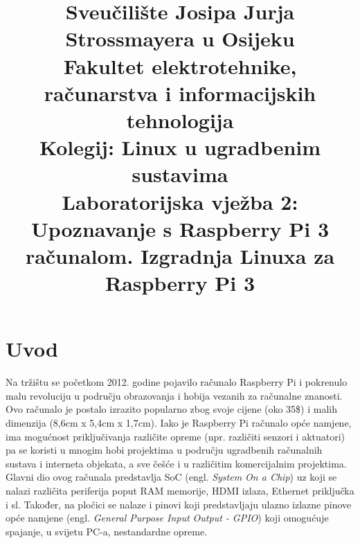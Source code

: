 \documentclass[11pt]{article}
\title{
	\Large Sveučilište Josipa Jurja Strossmayera u Osijeku \\
	Fakultet elektrotehnike, računarstva i informacijskih tehnologija \\
	\vspace{4cm}
	\Large Kolegij: Linux u ugradbenim sustavima \\
	\vspace{4cm}
	\Large \textbf{Laboratorijska vježba 2: Upoznavanje s Raspberry Pi 3
	računalom. Izgradnja Linuxa za Raspberry Pi 3}
	}
\date{}
\begin{document}
\maketitle
\thispagestyle{empty}
\newpage

\section{Uvod}
Na tržištu se početkom 2012. godine pojavilo računalo Raspberry Pi i pokrenulo
 malu revoluciju u području obrazovanja i hobija vezanih za računalne znanosti.
 Ovo računalo je postalo izrazito popularno zbog svoje cijene (oko 35\$) i
 malih dimenzija (8,6cm x 5,4cm x 1,7cm). Iako je Raspberry Pi računalo opće
 namjene, ima mogućnost priključivanja različite opreme (npr. različiti senzori
 i aktuatori) pa se koristi u mnogim hobi projektima u području ugradbenih
 računalnih sustava i interneta objekata, a sve češće i u različitim
 komercijalnim projektima. Glavni dio ovog računala predstavlja SoC (engl.
 \textit{System On a Chip}) uz koji se nalazi različita periferija poput RAM
 memorije, HDMI izlaza, Ethernet priključka i sl. Također, na pločici se
 nalaze i pinovi koji predstavljaju ulazno izlazne pinove opće namjene (engl.
 \textit{General Purpose Input Output - GPIO}) koji omogućuje spajanje, u
 svijetu PC-a, nestandardne opreme.
\end{document}
